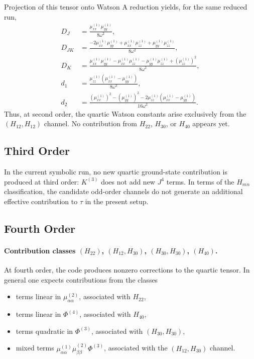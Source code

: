 \documentclass[11pt,a4paper]{article}
\begin{document}
Projection of this tensor onto Watson A reduction yields, for the same reduced run,
\begin{align}
D_J &= \frac{\mu_{xx}^{(1)}\mu_{yy}^{(1)}}{8\omega^2},\\
D_{JK} &= \frac{-2\mu_{xx}^{(1)}\mu_{yy}^{(1)} + \mu_{xx}^{(1)}\mu_{zz}^{(1)} + \mu_{yy}^{(1)}\mu_{zz}^{(1)}}{8\omega^2},\\
D_K &= \frac{\mu_{xx}^{(1)}\mu_{yy}^{(1)} - \mu_{xx}^{(1)}\mu_{zz}^{(1)} - \mu_{yy}^{(1)}\mu_{zz}^{(1)} + \left(\mu_{zz}^{(1)}\right)^2}{8\omega^2},\\
d_1 &= \frac{\mu_{zz}^{(1)}\left(\mu_{xx}^{(1)}-\mu_{yy}^{(1)}\right)}{8\omega^2},\\
d_2 &= \frac{\left(\mu_{xx}^{(1)}\right)^2 - \left(\mu_{yy}^{(1)}\right)^2 - 2\mu_{zz}^{(1)}\left(\mu_{xx}^{(1)}-\mu_{yy}^{(1)}\right)}{16\omega^2}.
\end{align}
Thus, at second order, the quartic Watson constants arise exclusively from the
\((H_{12},H_{12})\) channel. No contribution from \(H_{22}\), \(H_{30}\), or \(H_{40}\)
appears yet.

\subsection{Third Order}
In the current symbolic run, no new quartic ground-state contribution is produced at third order:
\(K^{(3)}\) does not add new \(J^4\) terms. In terms of the \(H_{mn}\) classification, the
candidate odd-order channels do not generate an additional effective contribution to \(\tau\)
in the present setup.

\subsection{Fourth Order}
\paragraph{Contribution classes \((H_{22})\), \((H_{12},H_{30})\), \((H_{30},H_{30})\), \((H_{40})\).}
At fourth order, the code produces nonzero corrections to the quartic tensor. In general one
expects contributions from the classes
\begin{itemize}
\item terms linear in \(\mu_{\alpha\alpha}^{(2)}\), associated with \(H_{22}\),
\item terms linear in \(\Phi^{(4)}\), associated with \(H_{40}\),
\item terms quadratic in \(\Phi^{(3)}\), associated with \((H_{30},H_{30})\),
\item mixed terms \(\mu_{\alpha\alpha}^{(1)}\mu_{\beta\beta}^{(2)}\Phi^{(3)}\), associated with the \((H_{12},H_{30})\) channel.
\end{itemize}
\end{document}
